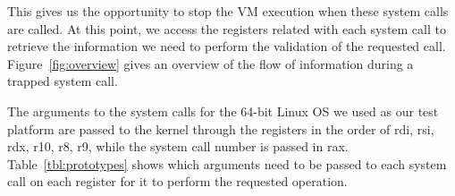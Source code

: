 \par This gives us the opportunity to stop the \ac{VM} execution when these system calls are called. At this point, we access the registers related with each system call to retrieve the information we need to perform the validation of the requested call. Figure~\ref{fig:overview} gives an overview of the flow of information during a trapped system call. 

\par The arguments to the system calls for the 64-bit Linux \ac{OS} we used as our test platform are passed to the kernel through the registers in the order of rdi, rsi, rdx, r10, r8, r9, while the system call number is passed in rax. Table~\ref{tbl:prototypes} shows which arguments need to be passed to each system call on each register for it to perform the requested operation.

